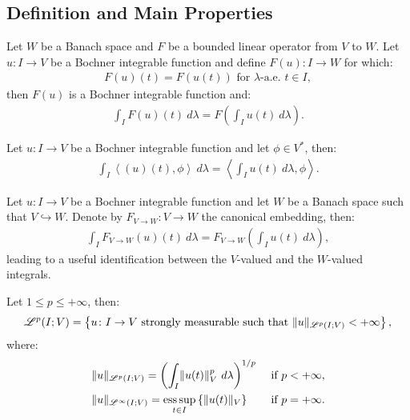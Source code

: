 \subsection{Definition and Main Properties}

\begin{corollary}
    Let $W$ be a Banach space and $F$ be a bounded linear operator from $V$ to $W$. Let $u\colon I \rightarrow V$ be a Bochner integrable function and define $F(u) \colon I \rightarrow W$ for which:
    \begin{gather}
        F(u)(t) = F(u(t)) \text{ for } \lambda \text{-a.e. } t \in I,
    \end{gather}
    then $F(u)$ is a Bochner integrable function and:
    \begin{gather}
        \int_I F(u)(t) ~ d \lambda = F\left( \int_I u(t) ~ d \lambda \right).
    \end{gather}
\end{corollary}

\begin{remark} %
    Let $u\colon I \rightarrow V$ be a Bochner integrable function and let $\phi \in V^*$, then:
    \begin{gather}
        \int_I \left\langle (u)(t), \phi \right\rangle ~ d \lambda = \left\langle \int_I u(t) ~ d \lambda, \phi \right\rangle.
    \end{gather}
\end{remark}

\begin{remark}[Embedding]
    Let $u\colon I \rightarrow V$ be a Bochner integrable function and let $W$ be a Banach space such that $V \hookrightarrow W$. Denote by $F_{V \rightarrow W} \colon V \rightarrow W$ the canonical embedding, then:
    \begin{gather}
        \int_I F_{V \rightarrow W}(u)(t) ~ d \lambda = F_{V \rightarrow W}\left( \int_I u(t) ~ d \lambda \right),
    \end{gather}
    leading to a useful identification between the $V$-valued and the $W$-valued integrals.
\end{remark}

\begin{definition}[$\Lp{p}(I; V)$]
    Let $1 \leq p \leq +\infty$, then:
    \begin{gather}
        \mathscr{L}^{p}(I; V) = \left\{ u \colon I \rightarrow V \text{ strongly measurable such that } \lVert u \rVert_{\mathscr{L}^{p}(I; V)} < +\infty \right\},
    \end{gather}
    where:
    \begin{align}
        & \lVert u \rVert_{\mathscr{L}^{p}(I; V)} = \left( \int_I \lVert u(t) \rVert_V^p ~ d \lambda \right)^{1/p} & \text{ if } p < +\infty, \\
        & \lVert u \rVert_{\mathscr{L}^{\infty}(I; V)} = \operatorname*{ess\,sup}_{t \in I} \left\{ \lVert u(t) \rVert_V \right\} & \text{ if } p = +\infty.
    \end{align}
\end{definition}


